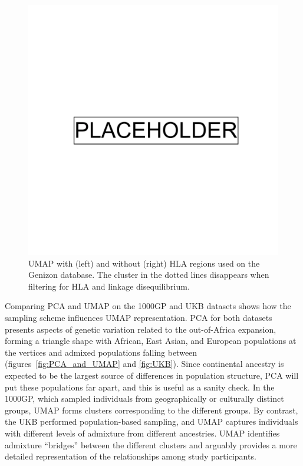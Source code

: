\clearpage

\begin{figure}[ht]
  \centering
        \includegraphics[width=0.8\linewidth]{placeholder.png}
  \caption[UMAP with and without HLA regions filtered]{UMAP with (left) and without (right) HLA regions used on the Genizon database. The cluster in the dotted lines disappears when filtering for HLA and linkage disequilibrium.}
  \label{fig:HLA}
\end{figure}

\clearpage

Comparing PCA and UMAP on the 1000GP and UKB datasets shows how the sampling scheme influences UMAP representation. PCA for both datasets presents aspects of genetic variation related to the out-of-Africa expansion, forming a triangle shape with African, East Asian, and European populations at the vertices and admixed populations falling between (figures~\ref{fig:PCA_and_UMAP} and \ref{fig:UKB}). Since continental ancestry is expected to be the largest source of differences in population structure, PCA will put these populations far apart, and this is useful as a sanity check. In the 1000GP, which sampled individuals from geographically or culturally distinct groups, UMAP forms clusters corresponding to the different groups. By contrast, the UKB performed population-based sampling, and UMAP captures individuals with different levels of admixture from different ancestries. UMAP identifies admixture ``bridges'' between the different clusters and arguably provides a more detailed representation of the relationships among study participants. 

